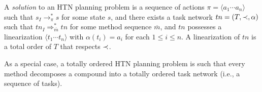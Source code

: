 
A \emph{solution} to an HTN planning problem is a sequence of actions $\pi = \langle a_{1} \cdots a_{n} \rangle$ such that $s_{I} \to^{\ast}_{\pi} s$ for some state $s$, and there exists a task network $tn = (T, \mathord{\prec}{}, \alpha)$ such that $tn_{I} \Rightarrow^{\ast}_{\overline{m}} tn$ for some method sequence $\overline{m}$, and $tn$ possesses a linearization $\langle t_{1} \cdots t_{n} \rangle$ with $\alpha(t_{i}) = a_{i}$ for each $1 \leq i \leq n$. A linearization of $tn$ is a total order of $T$ that respects $\mathord{\prec}{}$.

As a special case, a totally ordered HTN planning problem is such that every method decomposes a compound into a totally ordered task network (i.e., a sequence of tasks).